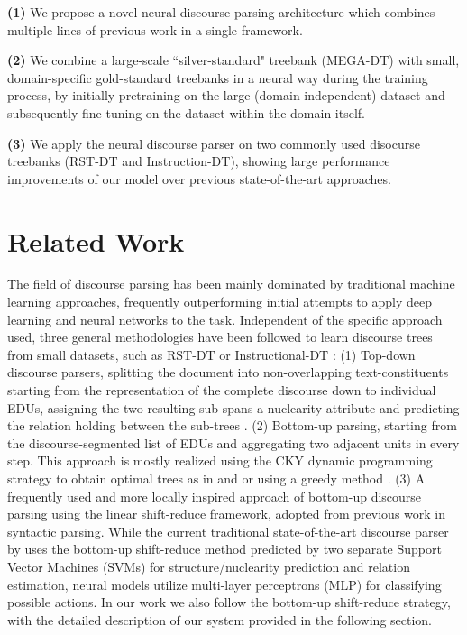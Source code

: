 \documentclass[11pt]{article}
\begin{document}
\textbf{(1)} We propose a novel neural discourse parsing architecture which combines multiple lines of previous work in a single framework.


\textbf{(2)} We combine a large-scale ``silver-standard" treebank (MEGA-DT) with small, domain-specific gold-standard treebanks in a neural way during the training process, by initially pretraining on the large (domain-independent) dataset and subsequently fine-tuning on the dataset within the domain itself. 

\textbf{(3)} We apply the neural discourse parser on two commonly used disocurse treebanks (RST-DT and Instruction-DT), showing large performance improvements of our model over previous state-of-the-art approaches.

\section{Related Work}
\label{rel_work}
The field of discourse parsing has been mainly dominated by traditional machine learning approaches, frequently outperforming initial attempts to apply deep learning and neural networks to the task. Independent of the specific approach used, three  general methodologies have been followed to learn discourse trees from small datasets, such as RST-DT \cite{carlson2002rst} or Instructional-DT \cite{subba2009effective}: (1) Top-down discourse parsers, splitting the document into non-overlapping text-constituents starting from the representation of the complete discourse down to individual EDUs, assigning the two resulting sub-spans a nuclearity attribute and predicting the relation holding between the sub-trees \cite{lin2019unified}. (2) Bottom-up parsing, starting from the discourse-segmented list of EDUs and aggregating two adjacent units in every step. This approach is mostly realized using the CKY dynamic programming strategy to obtain optimal trees as in  and  or using a greedy method \cite{hernault2010hilda}. (3) A frequently used and more locally inspired approach of bottom-up discourse parsing using the linear shift-reduce framework, adopted from previous work in syntactic parsing. 
While the current traditional state-of-the-art discourse parser by  uses the bottom-up shift-reduce method predicted by two separate Support Vector Machines (SVMs) for structure/nuclearity prediction and relation estimation, neural models \cite{yu2018transition,braud-etal-2017-cross-lingual} utilize multi-layer perceptrons (MLP) for classifying possible actions. In our work we also follow the bottom-up shift-reduce strategy, with the detailed description of our system provided in the following section.
\end{document}
